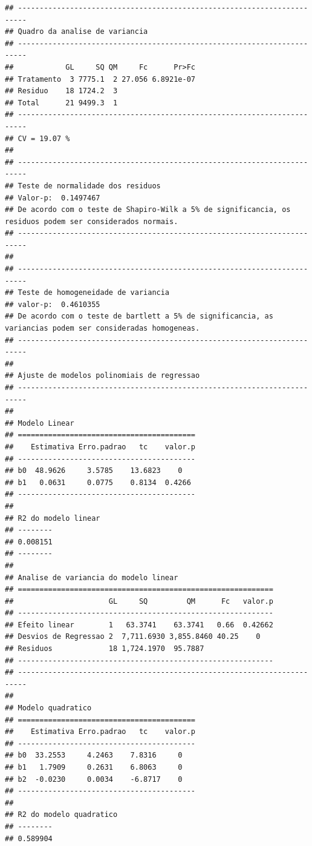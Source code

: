 \documentclass[
]{article}
\begin{document}
\begin{verbatim}
## ------------------------------------------------------------------------
## Quadro da analise de variancia
## ------------------------------------------------------------------------
##            GL     SQ QM     Fc      Pr>Fc
## Tratamento  3 7775.1  2 27.056 6.8921e-07
## Residuo    18 1724.2  3                  
## Total      21 9499.3  1                  
## ------------------------------------------------------------------------
## CV = 19.07 %
## 
## ------------------------------------------------------------------------
## Teste de normalidade dos residuos 
## Valor-p:  0.1497467 
## De acordo com o teste de Shapiro-Wilk a 5% de significancia, os residuos podem ser considerados normais.
## ------------------------------------------------------------------------
## 
## ------------------------------------------------------------------------
## Teste de homogeneidade de variancia 
## valor-p:  0.4610355 
## De acordo com o teste de bartlett a 5% de significancia, as variancias podem ser consideradas homogeneas.
## ------------------------------------------------------------------------
## 
## Ajuste de modelos polinomiais de regressao
## ------------------------------------------------------------------------
## 
## Modelo Linear
## =========================================
##    Estimativa Erro.padrao   tc    valor.p
## -----------------------------------------
## b0  48.9626     3.5785    13.6823    0   
## b1   0.0631     0.0775    0.8134  0.4266 
## -----------------------------------------
## 
## R2 do modelo linear
## --------
## 0.008151
## --------
## 
## Analise de variancia do modelo linear
## ===========================================================
##                      GL     SQ         QM      Fc   valor.p
## -----------------------------------------------------------
## Efeito linear        1   63.3741    63.3741   0.66  0.42662
## Desvios de Regressao 2  7,711.6930 3,855.8460 40.25    0   
## Residuos             18 1,724.1970  95.7887                
## -----------------------------------------------------------
## ------------------------------------------------------------------------
## 
## Modelo quadratico
## =========================================
##    Estimativa Erro.padrao   tc    valor.p
## -----------------------------------------
## b0  33.2553     4.2463    7.8316     0   
## b1   1.7909     0.2631    6.8063     0   
## b2  -0.0230     0.0034    -6.8717    0   
## -----------------------------------------
## 
## R2 do modelo quadratico
## --------
## 0.589904

\end{verbatim}
\end{document}

